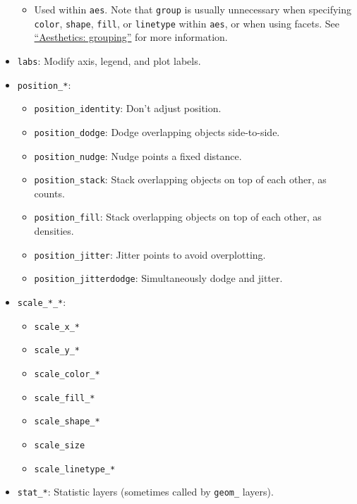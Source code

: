 \documentclass[]{book}
\providecommand{\tightlist}{%
  \setlength{\itemsep}{0pt}\setlength{\parskip}{0pt}}
\begin{document}
\begin{itemize}
  \begin{itemize}
  \tightlist
  \item
    Used within \texttt{aes}. Note that \texttt{group} is usually unnecessary when specifying \texttt{color}, \texttt{shape}, \texttt{fill}, or \texttt{linetype} within \texttt{aes}, or when using facets. See \href{https://ggplot2.tidyverse.org/reference/aes_group_order.html}{``Aesthetics: grouping''} for more information.
  \end{itemize}
\item
  \texttt{labs}: Modify axis, legend, and plot labels.
\item
  \texttt{position\_*}:

  \begin{itemize}
  \tightlist
  \item
    \texttt{position\_identity}: Don't adjust position.
  \item
    \texttt{position\_dodge}: Dodge overlapping objects side-to-side.
  \item
    \texttt{position\_nudge}: Nudge points a fixed distance.
  \item
    \texttt{position\_stack}: Stack overlapping objects on top of each other, as counts.
  \item
    \texttt{position\_fill}: Stack overlapping objects on top of each other, as densities.
  \item
    \texttt{position\_jitter}: Jitter points to avoid overplotting.
  \item
    \texttt{position\_jitterdodge}: Simultaneously dodge and jitter.
  \end{itemize}
\item
  \texttt{scale\_*\_*}:

  \begin{itemize}
  \tightlist
  \item
    \texttt{scale\_x\_*}
  \item
    \texttt{scale\_y\_*}
  \item
    \texttt{scale\_color\_*}
  \item
    \texttt{scale\_fill\_*}
  \item
    \texttt{scale\_shape\_*}
  \item
    \texttt{scale\_size}
  \item
    \texttt{scale\_linetype\_*}
  \end{itemize}
\item
  \texttt{stat\_*}: Statistic layers (sometimes called by \texttt{geom\_} layers).


\end{itemize}
\end{document}
